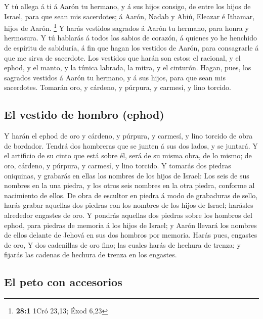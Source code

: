  Y tú allega á ti á Aarón tu hermano, y á sus hijos
consigo, de entre los hijos de Israel, para que sean mis sacerdotes; á
Aarón, Nadab y Abiú, Eleazar é Ithamar, hijos de Aarón. \footnote{\textbf{28:1}
  1Cró 23,13; Éxod 6,23}  Y harás vestidos sagrados á
Aarón tu hermano, para honra y hermosura.  Y tú hablarás á
todos los sabios de corazón, á quienes yo he henchido de espíritu de
sabiduría, á fin que hagan los vestidos de Aarón, para consagrarle á que
me sirva de sacerdote.  Los vestidos que harán son estos:
el racional, y el ephod, y el manto, y la túnica labrada, la mitra, y el
cinturón. Hagan, pues, los sagrados vestidos á Aarón tu hermano, y á sus
hijos, para que sean mis sacerdotes.  Tomarán oro, y
cárdeno, y púrpura, y carmesí, y lino torcido.

\hypertarget{el-vestido-de-hombro-ephod}{%
\subsection{El vestido de hombro
(ephod)}\label{el-vestido-de-hombro-ephod}}

 Y harán el ephod de oro y cárdeno, y púrpura, y carmesí,
y lino torcido de obra de bordador.  Tendrá dos hombreras
que se junten á sus dos lados, y se juntará.  Y el
artificio de su cinto que está sobre él, será de su misma obra, de lo
mismo; de oro, cárdeno, y púrpura, y carmesí, y lino torcido.
 Y tomarás dos piedras oniquinas, y grabarás en ellas los
nombres de los hijos de Israel:  Los seis de sus nombres
en la una piedra, y los otros seis nombres en la otra piedra, conforme
al nacimiento de ellos.  De obra de escultor en piedra á
modo de grabaduras de sello, harás grabar aquellas dos piedras con los
nombres de los hijos de Israel; harásles alrededor engastes de oro.
 Y pondrás aquellas dos piedras sobre los hombros del
ephod, para piedras de memoria á los hijos de Israel; y Aarón llevará
los nombres de ellos delante de Jehová en sus dos hombros por memoria.
 Harás pues, engastes de oro,  Y dos
cadenillas de oro fino; las cuales harás de hechura de trenza; y fijarás
las cadenas de hechura de trenza en los engastes.

\hypertarget{el-peto-con-accesorios}{%
\subsection{El peto con accesorios}\label{el-peto-con-accesorios}}

